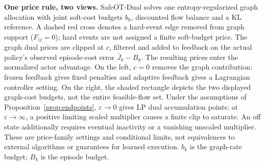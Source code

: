 \textbf{One price rule, two views.} SafeOT-Dual solves one entropy-regularized graph allocation with joint soft-cost budgets $b_k$, discounted flow balance and a KL reference. A dashed red cross denotes a hard-event edge removed from graph support ($F_{ij}=0$); hard events are not assigned a finite soft-budget price. The graph dual prices are clipped at $c$, filtered and added to feedback on the actual policy's observed episode-cost error $\bar J_k-B_k$. The resulting prices enter the normalized actor advantage. On the left, $c=0$ removes the graph contribution: frozen feedback gives fixed penalties and adaptive feedback gives a Lagrangian controller setting. On the right, the shaded rectangle depicts the two displayed graph-cost budgets, not the entire feasible-flow set. Under the assumptions of Proposition~\ref{prop:endpoints}, $\varepsilon\to0$ gives LP dual accumulation points; at $\varepsilon\to\infty$, a positive limiting scaled multiplier causes a finite clip to saturate. An off state additionally requires eventual inactivity or a vanishing unscaled multiplier. These are price-family settings and conditional limits, not equivalences to external algorithms or guarantees for learned execution. $b_k$ is the graph-rate budget; $B_k$ is the episode budget.

